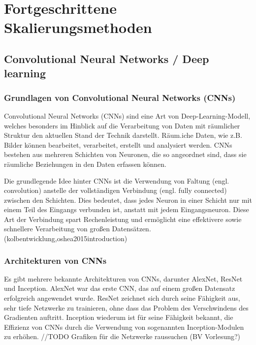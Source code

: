 


\chapter{Fortgeschrittene Skalierungsmethoden}
\section{Convolutional Neural Networks / Deep learning}
    \subsection{Grundlagen von Convolutional Neural Networks (CNNs)}
    Convolutional Neural Networks (CNNs) sind eine Art von Deep-Learning-Modell, welches besonders im Hinblick auf die Verarbeitung von Daten mit räumlicher Struktur den aktuellen Stand der Technik darstellt. 
Räum.iche Daten, wie z.B. Bilder können bearbeitet, verarbeitet, erstellt und analysiert werden. 
CNNs bestehen aus mehreren Schichten von Neuronen, die so angeordnet sind, dass sie räumliche Beziehungen in den Daten erfassen können.
    
    Die grundlegende Idee hinter CNNs ist die Verwendung von Faltung (engl. convolution) anstelle der vollständigen Verbindung (engl. fully connected) zwischen den Schichten. 
Dies bedeutet, dass jedes Neuron in einer Schicht nur mit einem Teil des Eingangs verbunden ist, anstatt mit jedem Eingangsneuron. 
Diese Art der Verbindung spart Rechenleistung und ermöglicht eine effektivere sowie schnellere Verarbeitung von großen Datensätzen.
    \footfullcite(kolbentwicklung,oshea2015introduction)
    \subsection{Architekturen von CNNs}
    
    Es gibt mehrere bekannte Architekturen von CNNs, darunter AlexNet, ResNet und Inception. 
AlexNet war das erste CNN, das auf einem großen Datensatz erfolgreich angewendet wurde. 
ResNet zeichnet sich durch seine Fähigkeit aus, sehr tiefe Netzwerke zu trainieren, ohne dass das Problem des Verschwindens des Gradienten auftritt. 
Inception wiederum ist für seine Fähigkeit bekannt, die Effizienz von CNNs durch die Verwendung von sogenannten Inception-Modulen zu erhöhen.
//TODO Grafiken für die Netzwerke raussuchen (BV Vorlesung?)

